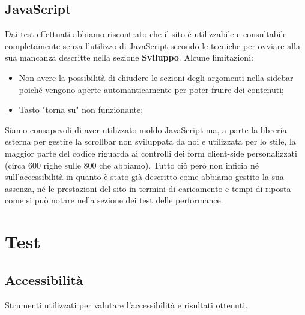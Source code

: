 \documentclass[12pt]{article}
\begin{document}
	\subsection{JavaScript}
	Dai test effettuati abbiamo riscontrato che il sito è utilizzabile e consultabile completamente senza l'utilizzo di JavaScript secondo le tecniche per ovviare alla sua mancanza descritte nella sezione \textbf{Sviluppo}. Alcune limitazioni:
	\begin{itemize}
		\item Non avere la possibilità di chiudere le sezioni degli argomenti nella sidebar poiché vengono aperte automanticamente per poter fruire dei contenuti;
		\item Tasto "torna su" non funzionante;
	\end{itemize}
	Siamo consapevoli di aver utilizzato moldo JavaScript ma, a parte la libreria esterna per gestire la scrollbar non sviluppata da noi e utilizzata per lo stile, la maggior parte del codice riguarda ai controlli dei form client-side personalizzati (circa 600 righe sulle 800 che abbiamo).
	Tutto ciò però non inficia né sull'accessibilità in quanto è stato già descritto come abbiamo gestito la sua assenza, né le prestazioni del sito in termini di caricamento e tempi di riposta come si può notare nella sezione dei test delle performance.
	
	\section{Test}
	\subsection{Accessibilità}
	Strumenti utilizzati per valutare l'accessibilità e risultati ottenuti.
\end{document}
